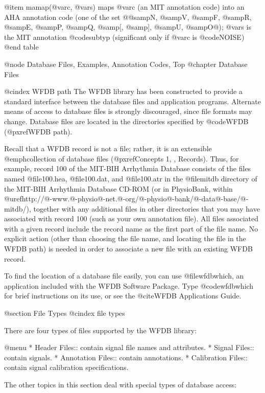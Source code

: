 {{{{{{{{{{@item mamap(@var{c}, @var{s})
maps @var{c} (an MIT annotation code) into an AHA annotation code
(one of the set @{@samp{N}, @samp{V}, @samp{F}, @samp{R}, @samp{E},
@samp{P}, @samp{Q}, @samp{[}, @samp{]}, @samp{U}, @samp{O}@}); @var{s}
is the MIT annotation @code{subtyp} (significant only if @var{c} is
@code{NOISE})
@end table

@node     Database Files, Examples, Annotation Codes, Top
@chapter Database Files

@cindex WFDB path
The WFDB library has been constructed to provide a standard interface
between the database files and application programs.  Alternate means of
access to database files is strongly discouraged, since file formats may
change.  Database files are located in the directories specified by
@code{WFDB} (@pxref{WFDB path}).

Recall that a WFDB record is not a file; rather, it is an extensible
@emph{collection} of database files (@pxref{Concepts 1, , Records}).  Thus, for
example, record 100 of the MIT-BIH Arrhythmia Database consists of the files
named @file{100.hea}, @file{100.dat}, and @file{100.atr} in the @file{mitdb}
directory of the MIT-BIH Arrhythmia Database CD-ROM (or in PhysioBank, within
@uref{http://@-www.@-physio@-net.@-org/@-physio@-bank/@-data@-base/@-mitdb/}),
together with any additional files in other directories that you may have
associated with record 100 (such as your own annotation file).  All files
associated with a given record include the record name as the first part of the
file name.  No explicit action (other than choosing the file name, and locating
the file in the WFDB path) is needed in order to associate a new file with an
existing WFDB record.

To find the location of a database file easily, you can use @file{wfdbwhich},
an application included with the WFDB Software Package.  Type
@code{wfdbwhich} for brief instructions on its use, or see the @cite{WFDB
Applications Guide}.

@section File Types
@cindex file types

There are four types of files supported by the WFDB library:

@menu
* Header Files::		contain signal file names and attributes.
* Signal Files::		contain signals.
* Annotation Files::		contain annotations.
* Calibration Files::		contain signal calibration specifications.

The other topics in this section deal with special types of database access:

}}}}}}}}}}
